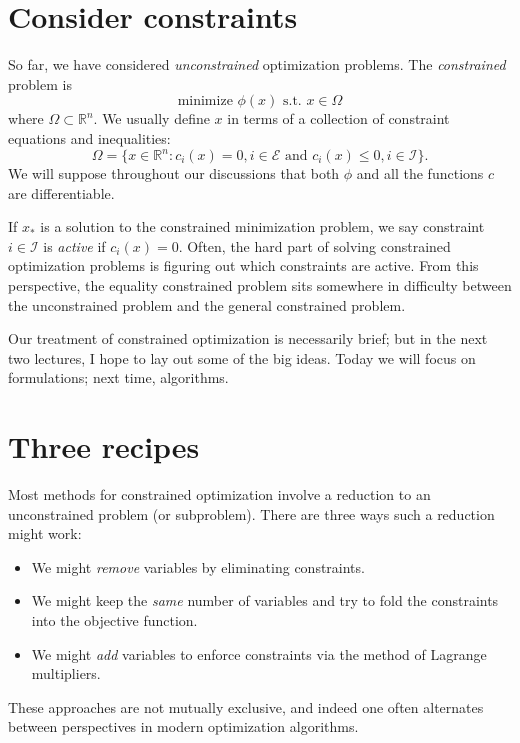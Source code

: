 \documentclass[12pt, leqno]{article} %
\providecommand{\tightlist}{%
  \setlength{\itemsep}{0pt}\setlength{\parskip}{0pt}}
\begin{document}

\section{Consider constraints}

So far, we have considered \emph{unconstrained} optimization problems.
The \emph{constrained} problem is
\[\mbox{minimize } \phi(x) \mbox{ s.t. } x \in \Omega\] where
\(\Omega \subset {\mathbb{R}}^n\). We usually define \(x\) in terms of a
collection of constraint equations and inequalities:
\[\Omega = \{ x \in {\mathbb{R}}^n :
  c_i(x) = 0, i \in \mathcal{E} \mbox{ and }
  c_i(x) \leq 0, i \in \mathcal{I} \}.\] We will suppose throughout our
discussions that both \(\phi\) and all the functions \(c\) are
differentiable.

If \(x_*\) is a solution to the constrained minimization problem, we say
constraint \(i \in \mathcal{I}\) is \emph{active} if \(c_i(x) = 0\).
Often, the hard part of solving constrained optimization problems is
figuring out which constraints are active. From this perspective, the
equality constrained problem sits somewhere in difficulty between the
unconstrained problem and the general constrained problem.

Our treatment of constrained optimization is necessarily brief; but in
the next two lectures, I hope to lay out some of the big ideas. Today we
will focus on formulations; next time, algorithms.

\section{Three recipes}

Most methods for constrained optimization involve a reduction to an
unconstrained problem (or subproblem). There are three ways such a
reduction might work:

\begin{itemize}
\tightlist
\item
  We might \emph{remove} variables by eliminating constraints.
\item
  We might keep the \emph{same} number of variables and try to fold the
  constraints into the objective function.
\item
  We might \emph{add} variables to enforce constraints via the method of
  Lagrange multipliers.
\end{itemize}

These approaches are not mutually exclusive, and indeed one often
alternates between perspectives in modern optimization algorithms.
\end{document}
